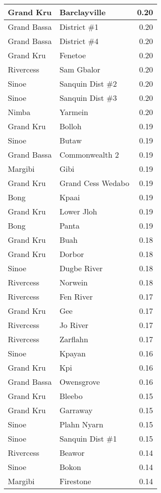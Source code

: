 \documentclass[
]{article}
\begin{document}
\begin{tabular}[t]{l|l|r}
\hline
Grand Kru & Barclayville & 0.20\\
\hline
Grand Bassa & District \#1 & 0.20\\
\hline
Grand Bassa & District \#4 & 0.20\\
\hline
Grand Kru & Fenetoe & 0.20\\
\hline
Rivercess & Sam Gbalor & 0.20\\
\hline
Sinoe & Sanquin Dist \#2 & 0.20\\
\hline
Sinoe & Sanquin Dist \#3 & 0.20\\
\hline
Nimba & Yarmein & 0.20\\
\hline
Grand Kru & Bolloh & 0.19\\
\hline
Sinoe & Butaw & 0.19\\
\hline
Grand Bassa & Commonwealth 2 & 0.19\\
\hline
Margibi & Gibi & 0.19\\
\hline
Grand Kru & Grand Cess Wedabo & 0.19\\
\hline
Bong & Kpaai & 0.19\\
\hline
Grand Kru & Lower Jloh & 0.19\\
\hline
Bong & Panta & 0.19\\
\hline
Grand Kru & Buah & 0.18\\
\hline
Grand Kru & Dorbor & 0.18\\
\hline
Sinoe & Dugbe River & 0.18\\
\hline
Rivercess & Norwein & 0.18\\
\hline
Rivercess & Fen River & 0.17\\
\hline
Grand Kru & Gee & 0.17\\
\hline
Rivercess & Jo River & 0.17\\
\hline
Rivercess & Zarflahn & 0.17\\
\hline
Sinoe & Kpayan & 0.16\\
\hline
Grand Kru & Kpi & 0.16\\
\hline
Grand Bassa & Owensgrove & 0.16\\
\hline
Grand Kru & Bleebo & 0.15\\
\hline
Grand Kru & Garraway & 0.15\\
\hline
Sinoe & Plahn Nyarn & 0.15\\
\hline
Sinoe & Sanquin Dist \#1 & 0.15\\
\hline
Rivercess & Beawor & 0.14\\
\hline
Sinoe & Bokon & 0.14\\
\hline
Margibi & Firestone & 0.14\\
\hline

\end{tabular}
\end{document}
